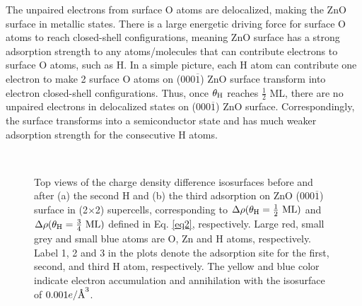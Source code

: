 The unpaired electrons from surface O atoms are delocalized, making the ZnO surface in metallic states. There is a large energetic driving force for surface O atoms to reach closed-shell configurations, meaning ZnO surface has a strong adsorption strength to any atoms/molecules that can contribute electrons to surface O atoms, such as H. In a simple picture, each H atom can contribute one electron to make 2 surface O atoms on (000$\overline{1}$) ZnO surface transform into electron closed-shell configurations. Thus, once $\theta_{\textup{H}}$ reaches $\frac{1}{2}$ ML, there are no unpaired electrons in delocalized states on (000$\overline{1}$) ZnO surface. Correspondingly, the surface transforms into a semiconductor state and has much weaker adsorption strength for the consecutive H atoms.

\begingroup
\begin{figure}[!ht]
  \centering
  \label{Chap:ZnO_H:fig:chgdiff1}
  \\
  \label{Chap:ZnO_H:fig:chgdiff2}
\caption[Top views of the charge density difference isosurfaces before and after H adsorption]{Top views of the charge density difference isosurfaces before and after (a) the second H and (b) the third adsorption on ZnO (000$\overline{1}$) surface in (2$\times$2) supercells, corresponding to $\Delta\rho(\theta_{\textup{H}}= \frac{1}{2} \textup{ ML})$ and $\Delta\rho(\theta_{\textup{H}}= \frac{3}{4} \textup{ ML})$ defined in Eq. \ref{eq2}, respectively. Large red, small grey and small blue atoms are O, Zn and H atoms, respectively. Label 1, 2 and 3 in the plots denote the adsorption site for the first, second, and third H atom, respectively. The yellow and blue color indicate electron accumulation and annihilation with the isosurface of $0.001e/{\textup{\AA}}^3$.}
  \label{fig3}
\end{figure}
\endgroup

